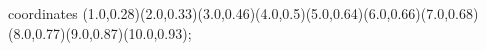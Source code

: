 					coordinates { (1.0,0.28)(2.0,0.33)(3.0,0.46)(4.0,0.5)(5.0,0.64)(6.0,0.66)(7.0,0.68)(8.0,0.77)(9.0,0.87)(10.0,0.93)};